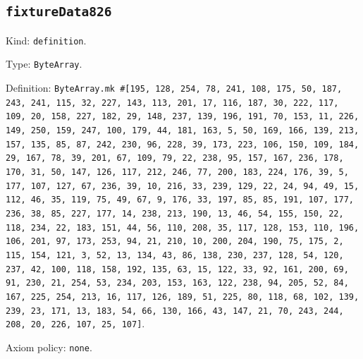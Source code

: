 \documentclass[11pt]{article}
\begin{document}
\subsection*{\texttt{fixtureData826}}
\noindent Kind: \texttt{definition}.\par
\noindent Type: \texttt{ByteArray}.\par
\noindent Definition: \texttt{ByteArray.mk \#[195, 128, 254, 78, 241, 108, 175, 50, 187, 243, 241, 115, 32, 227, 143, 113, 201, 17, 116, 187, 30, 222, 117, 109, 20, 158, 227, 182, 29, 148, 237, 139, 196, 191, 70, 153, 11, 226, 149, 250, 159, 247, 100, 179, 44, 181, 163, 5, 50, 169, 166, 139, 213, 157, 135, 85, 87, 242, 230, 96, 228, 39, 173, 223, 106, 150, 109, 184, 29, 167, 78, 39, 201, 67, 109, 79, 22, 238, 95, 157, 167, 236, 178, 170, 31, 50, 147, 126, 117, 212, 246, 77, 200, 183, 224, 176, 39, 5, 177, 107, 127, 67, 236, 39, 10, 216, 33, 239, 129, 22, 24, 94, 49, 15, 112, 46, 35, 119, 75, 49, 67, 9, 176, 33, 197, 85, 85, 191, 107, 177, 236, 38, 85, 227, 177, 14, 238, 213, 190, 13, 46, 54, 155, 150, 22, 118, 234, 22, 183, 151, 44, 56, 110, 208, 35, 117, 128, 153, 110, 196, 106, 201, 97, 173, 253, 94, 21, 210, 10, 200, 204, 190, 75, 175, 2, 115, 154, 121, 3, 52, 13, 134, 43, 86, 138, 230, 237, 128, 54, 120, 237, 42, 100, 118, 158, 192, 135, 63, 15, 122, 33, 92, 161, 200, 69, 91, 230, 21, 254, 53, 234, 203, 153, 163, 122, 238, 94, 205, 52, 84, 167, 225, 254, 213, 16, 117, 126, 189, 51, 225, 80, 118, 68, 102, 139, 239, 23, 171, 13, 183, 54, 66, 130, 166, 43, 147, 21, 70, 243, 244, 208, 20, 226, 107, 25, 107]}.\par
\noindent Axiom policy: \texttt{none}.\par
\end{document}
